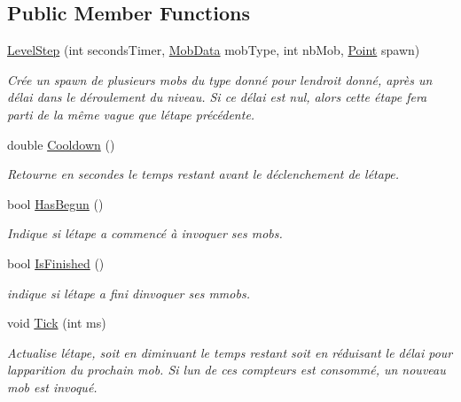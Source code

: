 \subsection*{Public Member Functions}
\begin{DoxyCompactItemize}
\item 
\hyperlink{class_tentacle_slicers_1_1levels_1_1_level_step_af0b20dbe2cbb48bd99c464b4ee49022c}{Level\+Step} (int seconds\+Timer, \hyperlink{class_tentacle_slicers_1_1actors_1_1_mob_data}{Mob\+Data} mob\+Type, int nb\+Mob, \hyperlink{class_tentacle_slicers_1_1general_1_1_point}{Point} spawn)
\begin{DoxyCompactList}\small\item\em Crée un spawn de plusieurs mobs du type donné pour l\textquotesingle{}endroit donné, après un délai dans le déroulement du niveau. Si ce délai est nul, alors cette étape fera parti de la même vague que l\textquotesingle{}étape précédente. \end{DoxyCompactList}\item 
double \hyperlink{class_tentacle_slicers_1_1levels_1_1_level_step_a299c53ae22104c17d82eee1193d8f6a9}{Cooldown} ()
\begin{DoxyCompactList}\small\item\em Retourne en secondes le temps restant avant le déclenchement de l\textquotesingle{}étape. \end{DoxyCompactList}\item 
bool \hyperlink{class_tentacle_slicers_1_1levels_1_1_level_step_a3b44842ad8568ede9c2e9ade82b8418b}{Has\+Begun} ()
\begin{DoxyCompactList}\small\item\em Indique si l\textquotesingle{}étape a commencé à invoquer ses mobs. \end{DoxyCompactList}\item 
bool \hyperlink{class_tentacle_slicers_1_1levels_1_1_level_step_ae8f84a9d4deab689789f0630a4c32a69}{Is\+Finished} ()
\begin{DoxyCompactList}\small\item\em indique si l\textquotesingle{}étape a fini d\textquotesingle{}invoquer ses mmobs. \end{DoxyCompactList}\item 
void \hyperlink{class_tentacle_slicers_1_1levels_1_1_level_step_a5f8a74eeee5fbc7bf29ea4ed2a065037}{Tick} (int ms)
\begin{DoxyCompactList}\small\item\em Actualise l\textquotesingle{}étape, soit en diminuant le temps restant soit en réduisant le délai pour l\textquotesingle{}apparition du prochain mob. Si l\textquotesingle{}un de ces compteurs est consommé, un nouveau mob est invoqué. \end{DoxyCompactList}\end{DoxyCompactItemize}


